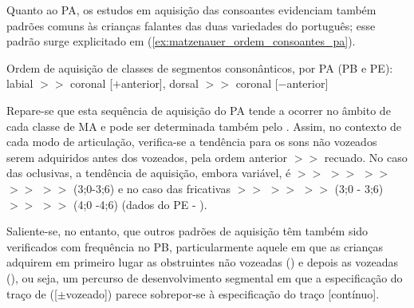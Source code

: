 \documentclass[output=paper]{LSP/langsci}
\begin{document}
Quanto ao PA, os estudos em aquisição das consoantes evidenciam também padrões comuns às crianças falantes das duas variedades do português; esse padrão surge explicitado em  (\ref{ex:matzenauer_ordem_consoantes_pa}).

\begin{exe}
\ex\label{ex:matzenauer_ordem_consoantes_pa} Ordem de aquisição de classes de segmentos consonânticos, por PA (PB e PE):\\labial{} $>>$ coronal [$+$anterior], dorsal $>>$ coronal  [$-$anterior]
\end{exe}

Repare-se que esta sequência de aquisição do PA tende a ocorrer no âmbito de cada classe de MA e pode ser determinada também pelo . Assim, no contexto de cada modo de articulação, verifica-se a tendência para os sons não vozeados serem adquiridos antes dos vozeados, pela ordem anterior $>>$ recuado. No caso das oclusivas, a tendência de aquisição, embora variável, é  $>>$  $>>$  $>>$  $>>$  $>>$  (3;0-3;6) e no caso das fricativas   $>>$  $>>$  $>>$   (3;0 - 3;6) $>>$  $>>$  (4;0 -4;6) (dados do PE - \citealt{mendes_etal2009,mendes_etal2013}). 

Saliente-se, no entanto, que outros padrões de aquisição têm também sido verificados com frequência no PB, particularmente aquele em que as crianças adquirem em primeiro lugar as obstruintes não vozeadas () e depois as vozeadas (), ou seja, um percurso de desenvolvimento segmental em que a especificação do traço de  ([$\pm$vozeado]) parece sobrepor-se à especificação do traço [contínuo].
\end{document}
